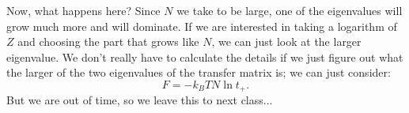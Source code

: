 Now, what happens here? Since $N$ we take to be large, one of the eigenvalues will grow much more and will dominate. If we are interested in taking a logarithm of $Z$ and choosing the part that grows like $N$, we can just look at the larger eigenvalue. We don't really have to calculate the details if we just figure out what the larger of the two eigenvalues of the transfer matrix is; we can just consider:
\begin{equation}
    F = -k_B T N \ln t_+.
\end{equation}
But we are out of time, so we leave this to next class...
